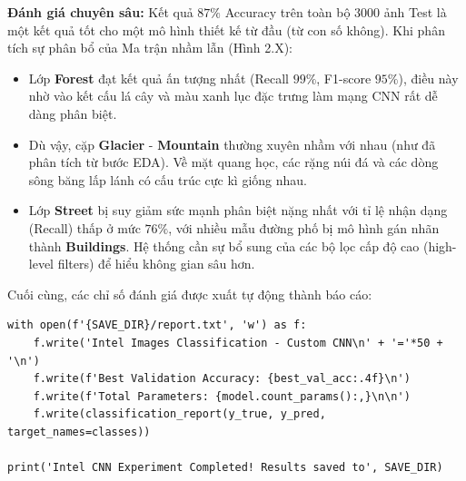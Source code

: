 \textbf{Đánh giá chuyên sâu:}
Kết quả $87\%$ Accuracy trên toàn bộ $3000$ ảnh Test là một kết quả tốt cho một mô hình thiết kế từ đầu (từ con số không). Khi phân tích sự phân bổ của Ma trận nhầm lẫn (Hình 2.X):
\begin{itemize}
    \item Lớp \textbf{Forest} đạt kết quả ấn tượng nhất (Recall $99\%$, F1-score $95\%$), điều này nhờ vào kết cấu lá cây và màu xanh lục đặc trưng làm mạng CNN rất dễ dàng phân biệt.
    \item Dù vậy, cặp \textbf{Glacier} - \textbf{Mountain} thường xuyên nhầm với nhau (như đã phân tích từ bước EDA). Về mặt quang học, các rặng núi đá và các dòng sông băng lấp lánh có cấu trúc cực kì giống nhau.
    \item Lớp \textbf{Street} bị suy giảm sức mạnh phân biệt nặng nhất với tỉ lệ nhận dạng (Recall) thấp ở mức $76\%$, với nhiều mẫu đường phố bị mô hình gán nhãn thành \textbf{Buildings}. Hệ thống cần sự bổ sung của các bộ lọc cấp độ cao (high-level filters) để hiểu không gian sâu hơn.
\end{itemize}

Cuối cùng, các chỉ số đánh giá được xuất tự động thành báo cáo:

\begin{lstlisting}[style=pythoncode, caption={Lưu báo cáo vào tệp văn bản}]
with open(f'{SAVE_DIR}/report.txt', 'w') as f:
    f.write('Intel Images Classification - Custom CNN\n' + '='*50 + '\n')
    f.write(f'Best Validation Accuracy: {best_val_acc:.4f}\n')
    f.write(f'Total Parameters: {model.count_params():,}\n\n')
    f.write(classification_report(y_true, y_pred, target_names=classes))

print('Intel CNN Experiment Completed! Results saved to', SAVE_DIR)
\end{lstlisting}
